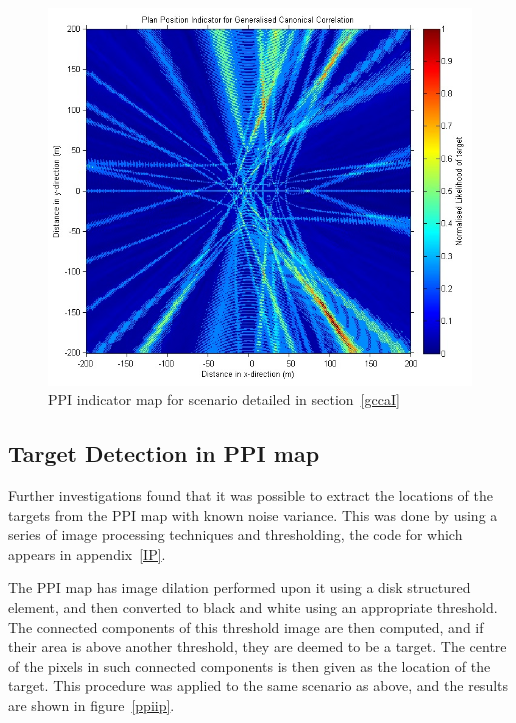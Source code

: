 \documentclass[12pt,openany,a4paper]{book}
\begin{document}
\begin{figure}[htbp]
\centerline{\includegraphics{ppi1.jpg}}
\caption{PPI indicator map for scenario detailed in section~\ref{gccaI}}
\label{ppi1}
\end{figure}

\subsection{Target Detection in PPI map}
Further investigations found that it was possible to extract the locations of the targets from the PPI map with known noise variance. This was done by using a series of image processing techniques and thresholding, the code for which appears in appendix~\ref{IP}.

\bigskip

The PPI map has image dilation performed upon it using a disk structured element, and then converted to black and white using an appropriate threshold. The connected components of this threshold image are then computed, and if their area is above another threshold, they are deemed to be a target. The centre of the pixels in such connected components is then given as the location of the target. This procedure was applied to the same scenario as above, and the results are shown in figure~\ref{ppiip}.
\end{document}
